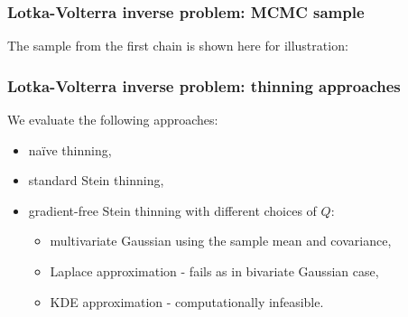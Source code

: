 \documentclass{beamer}
\begin{document}
\begin{frame}
\frametitle{Lotka-Volterra inverse problem: MCMC sample}

The sample from the first chain is shown here for illustration:

\begin{figure}[h]
\centering
{}
\end{figure}

\end{frame}

\begin{frame}
\frametitle{Lotka-Volterra inverse problem: thinning approaches}

We evaluate the following approaches:
\begin{itemize}
\item na\"ive thinning,
\item standard Stein thinning,
\item gradient-free Stein thinning with different choices of $Q$:
	\begin{itemize}
	\item multivariate Gaussian using the sample mean and covariance,
	\item Laplace approximation - \alert{fails as in bivariate Gaussian case},
	\item KDE approximation - \alert{computationally infeasible}.
	\end{itemize}
\end{itemize}

\end{frame}
\end{document}
